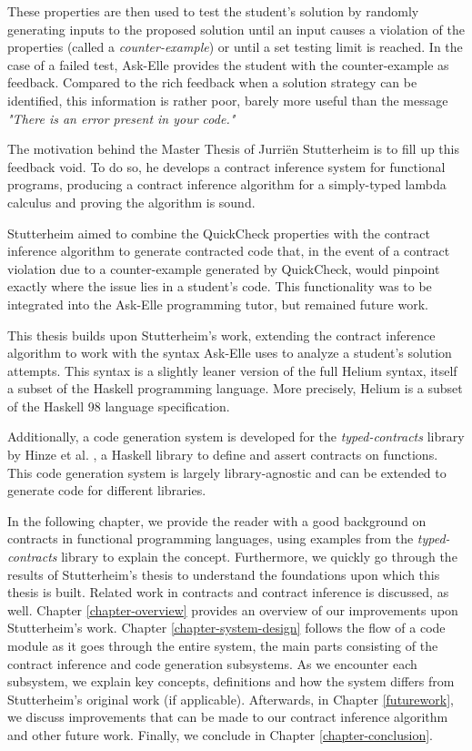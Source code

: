 \documentclass[10pt]{report}
\begin{document}
These properties are then used to test the student's solution by randomly generating inputs to the proposed solution until an input causes a violation of the properties (called a \textit{counter-example}) or until a set testing limit is reached.
In the case of a failed test, Ask-Elle provides the student with the counter-example as feedback.
Compared to the rich feedback when a solution strategy can be identified, this information is rather poor, barely more useful than the message \textit{"There is an error present in your code."}

The motivation behind the Master Thesis of Jurri\"en Stutterheim \cite{Stutterheim:2013:thesis} is to fill up this feedback void.
To do so, he develops a contract inference system for functional programs, producing a contract inference algorithm for a simply-typed lambda calculus and proving the algorithm is sound.

Stutterheim aimed to combine the QuickCheck properties with the contract inference algorithm to generate contracted code that, in the event of a contract violation due to a counter-example generated by QuickCheck, would pinpoint exactly where the issue lies in a student's code.
This functionality was to be integrated into the Ask-Elle programming tutor, but remained future work.

This thesis builds upon Stutterheim's work, extending the contract inference algorithm to work with the syntax Ask-Elle uses to analyze a student's solution attempts.
This syntax is a slightly leaner version of the full Helium syntax, itself a subset of the Haskell programming language.
More precisely, Helium is a subset of the Haskell 98 language specification.

Additionally, a code generation system is developed for the \textit{typed-contracts} library by Hinze et al. \cite{Hinze06typedcontracts}, a Haskell library to define and assert contracts on functions.
This code generation system is largely library-agnostic and can be extended to generate code for different libraries.

In the following chapter, we provide the reader with a good background on contracts in functional programming languages, using examples from the \textit{typed-contracts} library to explain the concept.
Furthermore, we quickly go through the results of Stutterheim's thesis to understand the foundations upon which this thesis is built.
Related work in contracts and contract inference is discussed, as well.
Chapter \ref{chapter-overview} provides an overview of our improvements upon Stutterheim's work.
Chapter \ref{chapter-system-design} follows the flow of a code module as it goes through the entire system, the main parts consisting of the contract inference and code generation subsystems.
As we encounter each subsystem, we explain key concepts, definitions and how the system differs from Stutterheim's original work (if applicable).
Afterwards, in Chapter \ref{futurework}, we discuss improvements that can be made to our contract inference algorithm and other future work.
Finally, we conclude in Chapter \ref{chapter-conclusion}.
\end{document}
